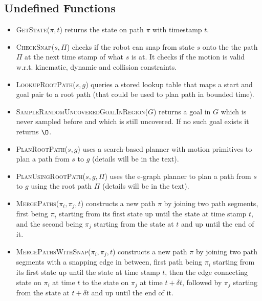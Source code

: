 \documentclass[letterpaper]{article} %
\begin{document}
\subsection*{Undefined Functions}
\begin{itemize}
  \item \textsc{GetState}($\pi,t$) returns the state on path $\pi$ with timestamp $t$.
  \item \textsc{CheckSnap}($s,\Pi$) checks if the robot can snap from state $s$ onto the the path $\Pi$ at the next time stamp of what $s$ is at. It checks if the motion is valid w.r.t. kinematic, dynamic and collision constraints.
  \item \textsc{LookupRootPath}($s,g$) queries a stored lookup table that maps a start and goal pair to a root path (that could be used to plan path in bounded time).
  \item \textsc{SampleRandomUncoveredGoalInRegion}($G$) returns a goal in $G$ which is never sampled before and which is still uncovered. If no such goal exists it returns $\O$.
  \item \textsc{PlanRootPath}($s,g$) uses a search-based planner with motion primitives to plan a path from $s$ to $g$ (details will be in the text).
  \item \textsc{PlanUsingRootPath}($s,g,\Pi$) uses the e-graph planner to plan a path from $s$ to $g$ using the root path $\Pi$ (details will be in the text).
  \item \textsc{MergePaths}($\pi_i,\pi_j,t$) constructs a new path $\pi$ by joining two path segments, first being $\pi_i$ starting from its first state up until the state at time stamp $t$, and the second being $\pi_j$ starting from the state at $t$ and up until the end of it.
  \item \textsc{MergePathsWithSnap}($\pi_i,\pi_j,t$) constructs a new path $\pi$ by joining two path segments with a snapping edge in between, first path being $\pi_i$ starting from its first state up until the state at time stamp $t$, then the edge connecting state on $\pi_i$ at time $t$ to the state on $\pi_j$ at time $t + \delta t$, followed by $\pi_j$ starting from the state at $t + \delta t$ and up until the end of it.
\end{itemize}
\end{document}

